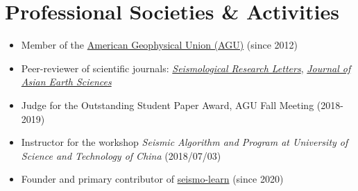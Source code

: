 \section{Professional Societies \& Activities}

\begin{itemize}
\item Member of the \href{https://sites.agu.org/}{American Geophysical Union (AGU)} (since 2012)
\item Peer-reviewer of scientific journals:
      \textit{\href{https://pubs.geoscienceworld.org/srl/}{Seismological Research Letters}},
      \textit{\href{https://www.journals.elsevier.com/journal-of-asian-earth-sciences/}{Journal of Asian Earth Sciences}}
\item Judge for the Outstanding Student Paper Award, AGU Fall Meeting (2018-2019)
\item Instructor for the workshop \textit{Seismic Algorithm and Program at University of Science and Technology of China} (2018/07/03)
\item Founder and primary contributor of \href{https://seismo-learn.org/}{seismo-learn} (since 2020)
\end{itemize}
